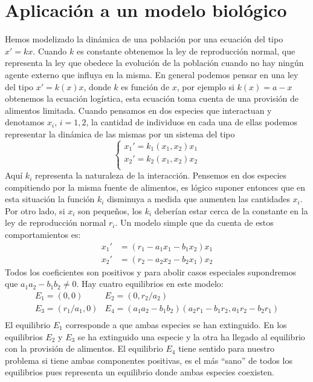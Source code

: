 \section{Aplicación  a un modelo biológico} Hemos modelizado la
dinámica de una población por una ecuación del tipo $x'=kx$.
Cuando $k$ es constante obtenemos la ley de reproducción normal,
que representa la ley que obedece la evolución de la población
cuando no hay ningún agente externo que influya en la misma. En
general podemos pensar en una ley del tipo $x'=k(x)x$, donde $k$
es función de $x$, por ejemplo si $k(x)=a-x$ obtenemos la ecuación
logística, esta ecuación toma cuenta de una provisión  de
alimentos limitada. Cuando pensamos en dos especies que
interactuan y denotamos $x_i$, $i=1,2$, la cantidad de individuos
en cada una de ellas podemos representar la dinámica de las mismas
por un sistema del tipo
\begin{equation}\label{2especies}
    \left\{%
\begin{array}{l}
    x_1'=k_1(x_1,x_2)x_1 \\
    x_2'=k_2(x_1,x_2)x_2 \\
\end{array}%
\right.
\end{equation}
Aquí $k_i$ representa la naturaleza de la interacción. Pensemos en
dos especies compitiendo por la misma fuente de alimentos, es
lógico suponer entonces que en esta situación la función $k_i$
disminuya a medida que aumenten las cantidades $x_i$.  Por otro
lado, si $x_i$ son pequeños, los $k_i$ deberían estar cerca de la
constante en la ley de reproducción normal $r_i$. Un modelo simple
que da cuenta de estos comportamientos es:
\begin{equation}\label{equa2espe}
\begin{split}
    x_1'&=(r_1-a_1x_1-b_1x_2)x_1\\
    x_2'&=(r_2-a_2x_2-b_2x_1)x_2
\end{split}
\end{equation}
Todos los coeficientes son positivos y para abolir casos
especiales supondremos que $a_1a_2-b_1b_2\neq 0$. Hay cuatro
equilibrios en este modelo:
\begin{equation}
    \begin{array}{ll}
        E_1=(0,0) & E_2=(0,r_2/a_2)\\
        E_3=(r_1/a_1,0) &
        E_4=(a_1a_2-b_1b_2)(a_2r_1-b_1r_2,a_1r_2-b_2r_1)\\
    \end{array}
\end{equation}
El equilibrio $E_1$ corresponde a que ambas especies se han
extinguido. En los equilibrios $E_2$ y $E_3$ se ha extinguido una
especie y la otra ha llegado al equilibrio con la provisión de
alimentos. El equilibrio $E_4$ tiene sentido para nuestro problema
si tiene ambas componentes positivas, es el más ``sano'' de todos
los equilibrios pues representa un equilibrio donde ambas especies
coexisten.

